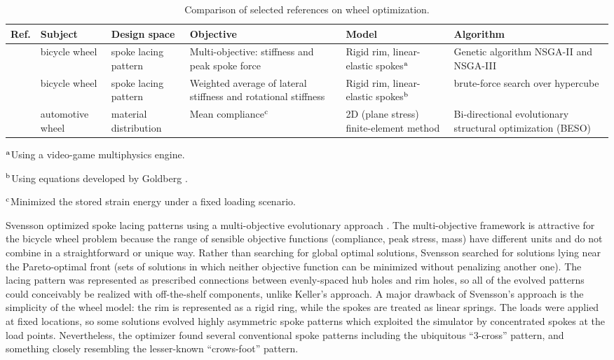 \documentclass[\rootdir/thesis.tex]{subfiles}
\begin{document}
\begin{table}
\caption{Comparison of selected references on wheel optimization.}
\begin{tabularx}{\textwidth}{l L L L L L}
\hline
\bf Ref. & \bf Subject & \bf Design space & \bf Objective & \bf Model & \bf Algorithm\\
\hline
\cite{Svensson2015} & bicycle wheel    & spoke lacing pattern  & Multi-objective: stiffness and peak spoke force &
	Rigid rim, linear-elastic spokes$^{\rm a}$ & Genetic algorithm NSGA-II and NSGA-III \cite{Deb2002,Deb2014}\\

\cite{Keller2013}   & bicycle wheel    & spoke lacing pattern  & Weighted average of lateral stiffness and rotational stiffness &
	Rigid rim, linear-elastic spokes$^{\rm b}$ & brute-force search over hypercube\\

\cite{Zuo2011}      & automotive wheel & material distribution & Mean compliance$^{\rm c}$ &
	2D (plane stress) finite-element method & Bi-directional evolutionary structural optimization (BESO) \cite{Huang2007}\\
\hline
\end{tabularx}
\raggedright{$^{\rm a}$Using a video-game multiphysics engine.}\\
\raggedright{$^{\rm b}$Using equations developed by Goldberg \cite{Goldberg1984}.}\\
\raggedright{$^{\rm c}$Minimized the stored strain energy under a fixed loading scenario.}
\end{table}

Svensson optimized spoke lacing patterns using a multi-objective evolutionary approach \cite{Svensson2015}. The multi-objective framework is attractive for the bicycle wheel problem because the range of sensible objective functions (compliance, peak stress, mass) have different units and do not combine in a straightforward or unique way. Rather than searching for global optimal solutions, Svensson searched for solutions lying near the Pareto-optimal front (sets of solutions in which neither objective function can be minimized without penalizing another one). The lacing pattern was represented as prescribed connections between evenly-spaced hub holes and rim holes, so all of the evolved patterns could conceivably be realized with off-the-shelf components, unlike Keller's approach. A major drawback of Svensson's approach is the simplicity of the wheel model: the rim is represented as a rigid ring, while the spokes are treated as linear springs. The loads were applied at fixed locations, so some solutions evolved highly asymmetric spoke patterns which exploited the simulator by concentrated spokes at the load points. Nevertheless, the optimizer found several conventional spoke patterns including the ubiquitous ``3-cross'' pattern, and something closely resembling the lesser-known ``crows-foot'' pattern.
\end{document}
